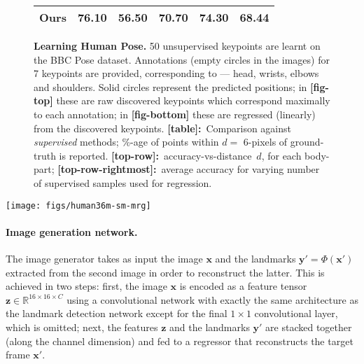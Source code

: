 \documentclass{article}
\newcommand{\bx}{\mathbf{x}}
\newcommand{\by}{\mathbf{y}}
\newcommand{\bz}{\mathbf{z}}
\begin{document}
\begin{figure}[t!]
\begin{minipage}{\textwidth}
\begin{minipage}[b]{0.47\textwidth}
{\begin{tabular}{@{}llllll@{}}
Ours            & 76.10                    & 56.50                      & 70.70                      & 74.30                         & 68.44
\\ \bottomrule
\end{tabular}}
    \captionsetup[table]{labelformat=empty}
    \captionsetup[table]{labelformat=empty}
  \end{minipage}
\end{minipage}
\caption{{\bf Learning Human Pose.} 50 unsupervised keypoints are learnt on the
         BBC Pose dataset. Annotations (empty circles in the images) for 7
         keypoints are provided, corresponding to --- head, wrists, elbows and shoulders.
         Solid circles represent the predicted positions;
         in {\bf [fig-top]} these are raw discovered keypoints which correspond
         maximally to each annotation; in {\bf [fig-bottom]} these are regressed
         (linearly) from the discovered keypoints.
        {\bf [table]:}~Comparison against \emph{supervised} methods;
        $\%$-age of points within $d{=}$ 6-pixels of ground-truth is reported.
        {\bf [top-row]:}~accuracy-vs-distance~$d$, for each body-part;
        {\bf [top-row-rightmost]:}~average accuracy for varying number of supervised samples used for regression.}\label{fig:bbc-paper}%
\end{figure}\begin{figure*}[b]
\centering
\texttt{[image: figs/human36m-sm-mrg]}
\caption{{\bf Unsupervised Landmarks on Human3.6M.} {\bf [left]:} an example quadruplet source-target-reconstruction-keypoint (left to right) from Human3.6M. {\bf [right]:} learned keypoints on a test video sequence. The landmarks consistently track the legs, arms, torso and head across frames.}\label{fig:human36m}
\label{fig:human36m}
\end{figure*}\paragraph{Image generation network.}

The image generator takes as input the image $\bx$ and the landmarks $\by' = \Phi(\bx')$ extracted from the second image in order to reconstruct the latter. This is achieved in two steps: first, the image $\bx$ is encoded as a feature tensor $\bz \in \mathbb{R}^{16\times 16\times C}$ using a convolutional network with exactly the same architecture as the landmark detection network except for the final $1{\times}1$ convolutional layer, which is omitted; next, the features $\bz$ and the landmarks $\by'$ are stacked together (along the channel dimension) and fed to a regressor that reconstructs the target frame $\bx'$.
\end{document}
